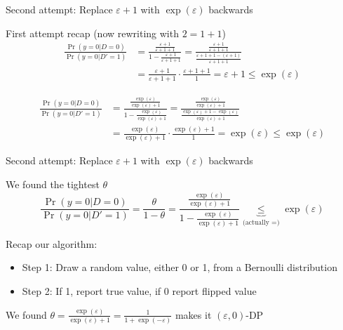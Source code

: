 \documentclass[12pt,aspectratio=169,handout]{beamer}
\begin{document}
\begin{frame}{Second attempt: Replace $\varepsilon + 1$ with $\exp(\varepsilon)$ backwards}

\begin{block}{First attempt recap (now rewriting with $2 = 1 + 1$)}
$$
\begin{aligned}
\frac{\Pr(y = 0 | D = 0)}{\Pr(y = 0 | D' = 1)} &=
\frac{
\frac{\varepsilon + 1}{\varepsilon + 1 + 1}
}{
	1 - \frac{\varepsilon + 1}{\varepsilon + 1 + 1}
}
=
\frac{
\frac{\varepsilon + 1}{\varepsilon + 1 + 1}
}{
\frac{\varepsilon + 1 + 1 - (\varepsilon + 1)}{\varepsilon + 1 + 1}
}\\
&=
\frac{\varepsilon + 1}{\varepsilon + 1 + 1}
\cdot
\frac{\varepsilon + 1 + 1}{1}
=
\varepsilon + 1
\leq \exp(\varepsilon)
\end{aligned}
$$
\end{block}
\vspace{-1em}
$$
\begin{aligned}
\frac{\Pr(y = 0 | D = 0)}{\Pr(y = 0 | D' = 1)} &=
\frac{
\frac{ \exp(\varepsilon)}{ \exp(\varepsilon) + 1}
}{
	1 - \frac{ \exp(\varepsilon)}{ \exp(\varepsilon) + 1}
}
=
\frac{
\frac{ \exp(\varepsilon)}{ \exp(\varepsilon) + 1}
}{
\frac{ \exp(\varepsilon) + 1 -  \exp(\varepsilon)}{ \exp(\varepsilon) + 1}
}\\
&=
\frac{ \exp(\varepsilon)}{ \exp(\varepsilon) + 1}
\cdot
\frac{ \exp(\varepsilon) + 1}{1}
=
\exp(\varepsilon)
\leq \exp(\varepsilon)
\end{aligned}
$$
\end{frame}





\begin{frame}{Second attempt: Replace $\varepsilon + 1$ with $\exp(\varepsilon)$ backwards}

\begin{block}{We found the tightest $\theta$}
$$
\frac{\Pr(y = 0 | D = 0)}{\Pr(y = 0 | D' = 1)} =
\frac{\theta}{1 - \theta} =
\frac{
\frac{ \exp(\varepsilon)}{ \exp(\varepsilon) + 1}
}{
	1 - \frac{ \exp(\varepsilon)}{ \exp(\varepsilon) + 1}
}
\underbrace{\leq}_{\text{(actually } = \text{)}}
\exp(\varepsilon)
$$
\end{block}


Recap our algorithm:

\begin{itemize}
\item Step 1: Draw a random value, either 0 or 1, from a Bernoulli distribution
\item Step 2: If 1, report true value, if 0 report flipped value
\end{itemize}

We found $\theta = \frac{\exp(\varepsilon)}{\exp(\varepsilon) + 1} = \frac{1}{1 + \exp(- \varepsilon)}$ makes it $(\varepsilon, 0)$-DP


\end{frame}
\end{document}

